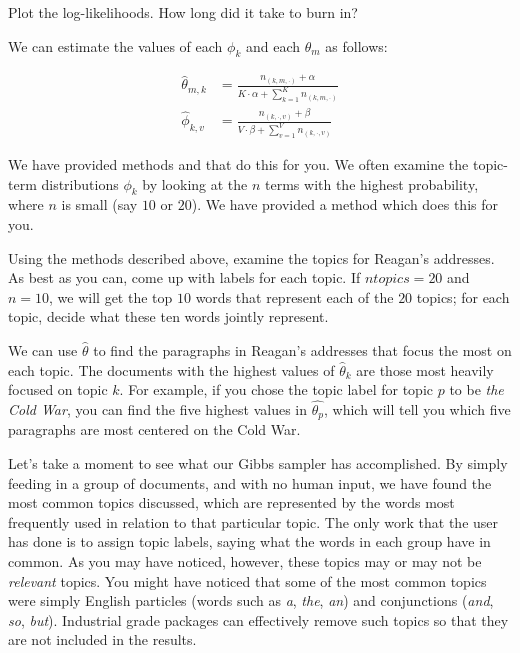 Plot the log-likelihoods. How long did it take to burn in?

We can estimate the values of each $\phi_{k}$ and each $\theta_{m}$ as follows:

\begin{align*}
\widehat{\theta}_{m,k} & = \frac{n_{(k,m,\cdot)} + \alpha}{K \cdot \alpha + \sum_{k=1}^{K} n_{(k,m,\cdot)}} \\
\widehat{\phi}_{k,v} & = \frac{n_{(k,\cdot,v)} + \beta}{V \cdot \beta + \sum_{v=1}^{V} n_{(k,\cdot,v)}}
\end{align*}

We have provided methods  and  that do this for you. We often examine the topic-term distributions $\phi_{k}$ by looking at the $n$ terms with the highest probability, where $n$ is small (say $10$ or $20$).
We have provided a method  which does this for you.

\begin{problem}
Using the methods described above, examine the topics for Reagan's addresses. As best as you can, come up with labels for each topic.
If $ntopics=20$ and $n=10$, we will get the top $10$ words that represent each of the $20$ topics; for each topic, decide what these ten words jointly represent.
\end{problem}

We can use $\widehat{\theta}$ to find the paragraphs in Reagan's addresses that focus the most on each topic. The documents with the highest values of $\widehat{\theta}_{k}$ are those most heavily focused on topic $k$.
For example, if you chose the topic label for topic $p$ to be \emph{the Cold War}, you can find the five highest values in $\widehat{\theta_{p}}$, which will tell you which five paragraphs are most centered on the Cold War.

Let's take a moment to see what our Gibbs sampler has accomplished.
By simply feeding in a group of documents, and with no human input, we have found the most common topics discussed, which are represented by the words most frequently used in relation to that particular topic.
The only work that the user has done is to assign topic labels, saying what the words in each group have in common.
As you may have noticed, however, these topics may or may not be \emph{relevant} topics.
You might have noticed that some of the most common topics were simply English particles (words such as \emph{a}, \emph{the}, \emph{an}) and conjunctions (\emph{and}, \emph{so}, \emph{but}).
Industrial grade packages can effectively remove such topics so that they are not included in the results.


